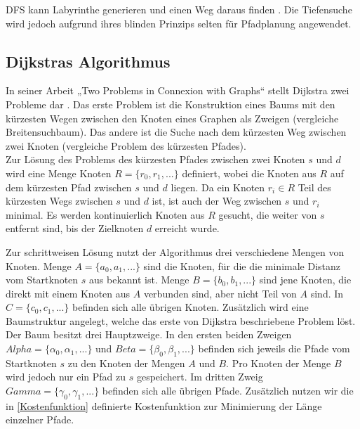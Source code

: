DFS kann Labyrinthe generieren und einen Weg daraus finden \cite{KB15}. Die Tiefensuche wird jedoch aufgrund ihres blinden Prinzips selten für Pfadplanung angewendet.


\subsection{Dijkstras Algorithmus}
In seiner Arbeit „Two Problems in Connexion with Graphs“ stellt Dijkstra zwei Probleme dar \cite{Dijkstra.1959}. Das erste Problem ist die Konstruktion eines Baums mit den kürzesten Wegen zwischen den Knoten eines Graphen als Zweigen (vergleiche Breitensuchbaum). Das andere ist die Suche nach dem kürzesten Weg zwischen zwei Knoten (vergleiche Problem des kürzesten Pfades). \\
Zur Lösung des Problems des kürzesten Pfades zwischen zwei Knoten $s$ und $d$ wird eine Menge Knoten $R = \{r_0, r_1, ...\}$ definiert, wobei die Knoten aus $R$ auf dem kürzesten Pfad zwischen $s$ und $d$ liegen. Da ein Knoten $r_i \in R$ Teil des kürzesten Wegs zwischen $s$ und $d$ ist, ist auch der Weg zwischen $s$ und $r_i$ minimal. Es werden kontinuierlich Knoten aus $R$ gesucht, die weiter von $s$ entfernt sind, bis der Zielknoten $d$ erreicht wurde.

Zur schrittweisen Lösung nutzt der Algorithmus drei verschiedene Mengen von Knoten. Menge $A = \{a_0, a_1, ...\}$ sind die Knoten, für die die minimale Distanz vom Startknoten $s$ aus bekannt ist. Menge $B = \{b_0, b_1, ...\}$ sind jene Knoten, die direkt mit einem Knoten aus $A$ verbunden sind, aber nicht Teil von $A$ sind. In $C = \{c_0, c_1, ...\}$ befinden sich alle übrigen Knoten.
Zusätzlich wird eine Baumstruktur angelegt, welche das erste von Dijkstra beschriebene Problem löst. Der Baum besitzt drei Hauptzweige. In den ersten beiden Zweigen $Alpha = \{\alpha_0, \alpha_1, ...\}$ und $Beta = \{\beta_0, \beta_1, ...\}$ befinden sich jeweils die Pfade vom Startknoten $s$ zu den Knoten der Mengen $A$ und $B$. Pro Knoten der Menge $B$ wird jedoch nur ein Pfad zu $s$ gespeichert. Im dritten Zweig $Gamma = \{\gamma_0, \gamma_1, ...\}$ befinden sich alle übrigen Pfade. Zusätzlich nutzen wir die in \ref{Kostenfunktion} definierte Kostenfunktion zur Minimierung der Länge einzelner Pfade.

